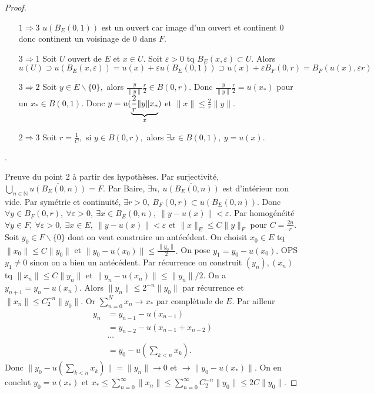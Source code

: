 \begin{proof}
\begin{itemize}
    \item[$1\Rightarrow 3$] $u(B_E(0,1))$ est un ouvert car image d'un ouvert et continent 0 donc continent un voisinage de 0 dans $F$.
    \item[$3\Rightarrow 1$] Soit $U$ ouvert de $E$ et $x\in U.$ Soit $\varepsilon >0$ tq $B_E(x,\varepsilon )\subset U.$ Alors $u(U)\supset u(B_E(x,\varepsilon ))=u(x)+\varepsilon u(B_E(0,1))\supset u(x)+\varepsilon B_F(0,r)=B_F(u(x),\varepsilon r)$
    \item[$3\Rightarrow 2$] Soit $y\in E\backslash \{0\} ,$ alors $\frac{y}{\|y\|}\frac{r}{2}\in B(0,r).$ Donc $\frac{y}{\|y\|}\frac{r}{2}=u(x_*)$ pour un $x_*\in B(0,1).$ Donc $y=u(\underbrace{\frac{2}{r}\|y\|x_*}_{\mathclap{x}})$ et $\|x\|\le \frac{2}{r}\|y\|.$
    \item[$2\Rightarrow 3$] Soit $r=\frac{1}{C},$ si $y\in B(0,r),$ alors $\exists x\in B(0,1),\ y=u(x).$
\end{itemize}.

Preuve du point 2 à partir des hypothèses. Par surjectivité, $\bigcup\limits_{n\in \mathbb{N} } \overline{u(B_E(0,n))}=F.$ Par Baire, $\exists n,\ \overline{u(B_E(0,n))}$ est d'intérieur non vide. Par symétrie et continuité, $\exists r>0,\ B_F(0,r)\subset \overline{u(B_E(0,n))}.$ Donc $\forall y\in B_F(0,r),\ \forall \varepsilon >0,\ \exists x\in B_E(0,n),\ \|y-u(x)\|<\varepsilon .$ Par homogénéité $\forall y\in  F,\ \forall \varepsilon >0,\ \exists x\in E,\ \|y-u(x)\|<\varepsilon $ et $\|x\|_E\le C\|y\|_F$ pour $C=\frac{2n}{r}$.\\
Soit $y_0\in F\backslash \{0\} $ dont on veut construire un antécédent. On choisit $x_0\in E$ tq $\|x_0\|\le C\|y_0\|$ et $\|y_0-u(x_0)\|\le \frac{\|y_0\|}{2}.$ On pose $y_1=y_0-u(x_0).$ OPS $y_1\neq 0$ sinon on a bien un antécédent. Par récurrence on construit $(y_n),(x_n)$ tq $\|x_n\|\le C\|y_n\|$ et $\|y_n-u(x_n)\|\le \|y_n\|/2.$ On a $y_{n+1}=y_n-u(x_n).$ Alors $\|y_n\|\le 2^{-n}\|y_0\|$ par récurrence et $\|x_n\|\le C_2^{-n}\|y_0\|.$ Or $\sum\limits_{n=0}^{N} x_n\to x_*$ par complétude de $E.$ Par ailleur
\begin{align*}
    y_n&=y_{n-1}-u(x_{n-1})\\
       &=y_{n-2}-u(x_{n-1}+x_{n-2})\\
       &\cdots\\
       &=y_0-u(\sum\limits_{k<n}^{} x_k).
\end{align*}
Donc $\|y_0-u(\sum\limits_{k<n}^{} x_k)\|=\|y_n\|\to 0$ et $\to \|y_0-u(x_*)\|$. On en conclut $y_0=u(x_*)$ et $x_*\le \sum\limits_{n=0}^{\infty} \|x_n\|\le \sum\limits_{n=0}^{\infty} C_2^{-n}\|y_0\|\le 2C\|y_0\|.$
\end{proof}

